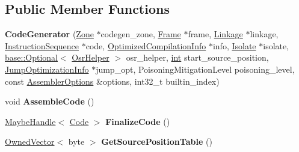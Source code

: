 \subsection*{Public Member Functions}
\begin{DoxyCompactItemize}
\item 
\mbox{\label{classv8_1_1internal_1_1compiler_1_1CodeGenerator_a9951f2bcc087981c6e6cab0a90618419}} 
{\bfseries Code\+Generator} (\mbox{\hyperlink{classv8_1_1internal_1_1Zone}{Zone}} $\ast$codegen\+\_\+zone, \mbox{\hyperlink{classv8_1_1internal_1_1compiler_1_1Frame}{Frame}} $\ast$frame, \mbox{\hyperlink{classv8_1_1internal_1_1compiler_1_1Linkage}{Linkage}} $\ast$linkage, \mbox{\hyperlink{classv8_1_1internal_1_1compiler_1_1InstructionSequence}{Instruction\+Sequence}} $\ast$code, \mbox{\hyperlink{classv8_1_1internal_1_1OptimizedCompilationInfo}{Optimized\+Compilation\+Info}} $\ast$info, \mbox{\hyperlink{classv8_1_1internal_1_1Isolate}{Isolate}} $\ast$isolate, \mbox{\hyperlink{classv8_1_1base_1_1Optional}{base\+::\+Optional}}$<$ \mbox{\hyperlink{classv8_1_1internal_1_1compiler_1_1OsrHelper}{Osr\+Helper}} $>$ osr\+\_\+helper, \mbox{\hyperlink{classint}{int}} start\+\_\+source\+\_\+position, \mbox{\hyperlink{classv8_1_1internal_1_1JumpOptimizationInfo}{Jump\+Optimization\+Info}} $\ast$jump\+\_\+opt, Poisoning\+Mitigation\+Level poisoning\+\_\+level, const \mbox{\hyperlink{structv8_1_1internal_1_1AssemblerOptions}{Assembler\+Options}} \&options, int32\+\_\+t builtin\+\_\+index)
\item 
\mbox{\label{classv8_1_1internal_1_1compiler_1_1CodeGenerator_a66b300247e9913b6e1e1d8b79c7f857c}} 
void {\bfseries Assemble\+Code} ()
\item 
\mbox{\label{classv8_1_1internal_1_1compiler_1_1CodeGenerator_a90a701a71ad5699639d55b2847f6974a}} 
\mbox{\hyperlink{classv8_1_1internal_1_1MaybeHandle}{Maybe\+Handle}}$<$ \mbox{\hyperlink{classv8_1_1internal_1_1Code}{Code}} $>$ {\bfseries Finalize\+Code} ()
\item 
\mbox{\label{classv8_1_1internal_1_1compiler_1_1CodeGenerator_aeb54a776eb2d4fbf7119382ef9253d60}} 
\mbox{\hyperlink{classv8_1_1internal_1_1OwnedVector}{Owned\+Vector}}$<$ byte $>$ {\bfseries Get\+Source\+Position\+Table} ()

\end{DoxyCompactItemize}
